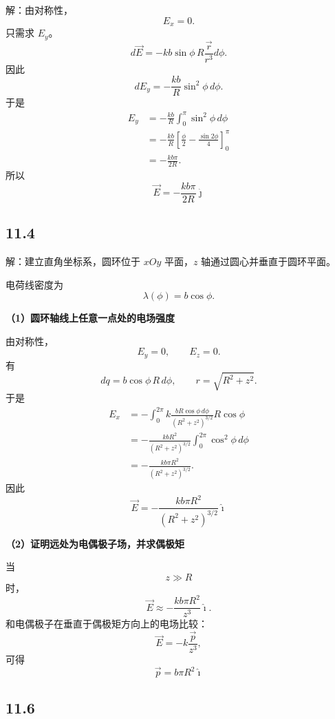 \documentclass[UTF8,a4paper,12pt]{ctexart}
\begin{document}
解：由对称性，
\[
E_x=0.
\]
只需求 $E_y$。
\[
d\vec{E}
=
-kb\sin\phi\,R
\frac{\vec{r}}{r^3}d\phi.
\]
因此
\[
dE_y
=
-\frac{kb}{R}\sin^2\phi\,d\phi.
\]
于是
\[
\begin{aligned}
E_y
&=
-\frac{kb}{R}
\int_0^\pi\sin^2\phi\,d\phi\\
&=
-\frac{kb}{R}
\left[
\frac{\phi}{2}-\frac{\sin 2\phi}{4}
\right]_0^\pi\\
&=
-\frac{kb\pi}{2R}.
\end{aligned}
\]
所以
\[
\boxed{
\vec{E}
=
-\frac{kb\pi}{2R}\hat{\jmath}
}
\]

\subsection*{11.4}

解：建立直角坐标系，圆环位于 $xOy$ 平面，$z$ 轴通过圆心并垂直于圆环平面。

电荷线密度为
\[
\lambda(\phi)=b\cos\phi.
\]

\textbf{（1）圆环轴线上任意一点处的电场强度}

由对称性，
\[
E_y=0,\qquad E_z=0.
\]
有
\[
dq=b\cos\phi\,R\,d\phi,
\qquad
r=\sqrt{R^2+z^2}.
\]
于是
\[
\begin{aligned}
E_x
&=
-\int_0^{2\pi}
k\frac{bR\cos\phi\,d\phi}{(R^2+z^2)^{3/2}}
R\cos\phi\\
&=
-\frac{kbR^2}{(R^2+z^2)^{3/2}}
\int_0^{2\pi}\cos^2\phi\,d\phi\\
&=
-\frac{kb\pi R^2}{(R^2+z^2)^{3/2}}.
\end{aligned}
\]
因此
\[
\boxed{
\vec{E}
=
-\frac{kb\pi R^2}{(R^2+z^2)^{3/2}}\hat{\imath}
}
\]

\textbf{（2）证明远处为电偶极子场，并求偶极矩}

当
\[
z\gg R
\]
时，
\[
\vec{E}
\approx
-\frac{kb\pi R^2}{z^3}\hat{\imath}.
\]
和电偶极子在垂直于偶极矩方向上的电场比较：
\[
\vec{E}=-k\frac{\vec{p}}{z^3},
\]
可得
\[
\boxed{
\vec{p}=b\pi R^2\hat{\imath}
}
\]

\subsection*{11.6}
\end{document}
